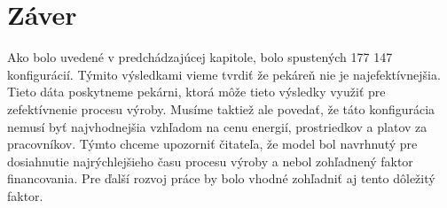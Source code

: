 \documentclass[a4paper, 10pt]{article}
\begin{document}
    \section{Záver}
    Ako bolo uvedené v predchádzajúcej kapitole, bolo spustených 177 147 konfigurácií. Týmito výsledkami vieme tvrdiť
    že pekáreň nie je najefektívnejšia.
    Tieto dáta poskytneme pekárni, ktorá môže tieto výsledky využiť pre zefektívnenie procesu výroby.
    Musíme taktiež ale povedať, že táto konfigurácia nemusí byť najvhodnejšia vzhľadom na cenu energií, prostriedkov a
    platov za pracovníkov. Týmto chceme upozorniť čitateľa, že model bol navrhnutý pre dosiahnutie najrýchlejšieho času
    procesu výroby a nebol zohľadnený faktor financovania. Pre ďalší rozvoj práce by bolo vhodné zohľadniť aj tento
    dôležitý faktor.


    \newpage
    
    
\end{document}
